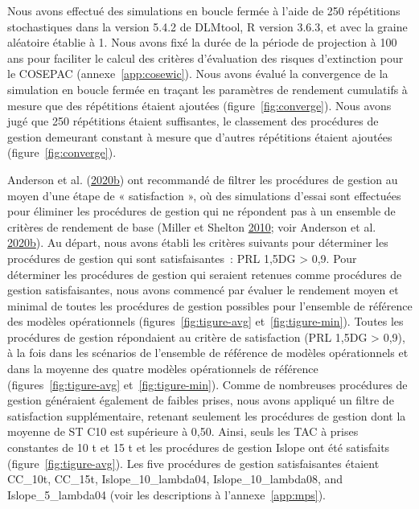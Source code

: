 \documentclass[french,11pt]{book}
\begin{document}
Nous avons effectué des simulations en boucle fermée à l'aide de 250 répétitions stochastiques dans la version 5.4.2 de DLMtool, R version 3.6.3, et avec la graine aléatoire établie à 1. Nous avons fixé la durée de la période de projection à 100 ans pour faciliter le calcul des critères d'évaluation des risques d'extinction pour le COSEPAC (annexe~\ref{app:cosewic}). Nous avons évalué la convergence de la simulation en boucle fermée en traçant les paramètres de rendement cumulatifs à mesure que des répétitions étaient ajoutées (figure~\ref{fig:converge}). Nous avons jugé que 250 répétitions étaient suffisantes, le classement des procédures de gestion demeurant constant à mesure que d'autres répétitions étaient ajoutées (figure~\ref{fig:converge}).

Anderson et al. (\protect\hyperlink{ref-anderson2020gfmp}{2020}\protect\hyperlink{ref-anderson2020gfmp}{b}) ont recommandé de filtrer les procédures de gestion au moyen d'une étape de « satisfaction », où des simulations d'essai sont effectuées pour éliminer les procédures de gestion qui ne répondent pas à un ensemble de critères de rendement de base (Miller et Shelton \protect\hyperlink{ref-miller2010}{2010}; voir Anderson et al. \protect\hyperlink{ref-anderson2020gfmp}{2020}\protect\hyperlink{ref-anderson2020gfmp}{b}). Au départ, nous avons établi les critères suivants pour déterminer les procédures de gestion qui sont satisfaisantes~: PRL 1,5DG \textgreater{} 0,9. Pour déterminer les procédures de gestion qui seraient retenues comme procédures de gestion satisfaisantes, nous avons commencé par évaluer le rendement moyen et minimal de toutes les procédures de gestion possibles pour l'ensemble de référence des modèles opérationnels (figures~\ref{fig:tigure-avg} et~\ref{fig:tigure-min}). Toutes les procédures de gestion répondaient au critère de satisfaction (PRL 1,5DG \textgreater{} 0,9), à la fois dans les scénarios de l'ensemble de référence de modèles opérationnels et dans la moyenne des quatre modèles opérationnels de référence (figures~\ref{fig:tigure-avg} et~\ref{fig:tigure-min}). Comme de nombreuses procédures de gestion généraient également de faibles prises, nous avons appliqué un filtre de satisfaction supplémentaire, retenant seulement les procédures de gestion dont la moyenne de ST C10 est supérieure à 0,50. Ainsi, seuls les TAC à prises constantes de 10 t et 15 t et les procédures de gestion Islope ont été satisfaits (figure~\ref{fig:tigure-avg}). Les five procédures de gestion satisfaisantes étaient CC\_10t, CC\_15t, Islope\_10\_lambda04, Islope\_10\_lambda08, and Islope\_5\_lambda04 (voir les descriptions à l'annexe~\ref{app:mps}).
\end{document}
